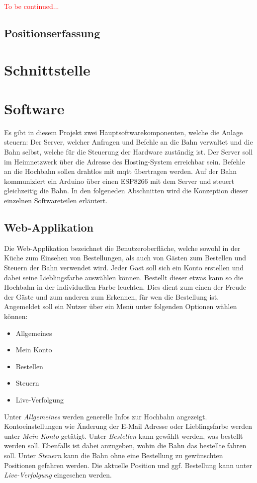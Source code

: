 \textcolor{red}{To be continued...}



\subsection{Positionserfassung}

\section{Schnittstelle}


\section{Software}
Es gibt in diesem Projekt zwei Hauptsoftwarekomponenten, welche die Anlage steuern: Der Server, welcher Anfragen und Befehle an die Bahn verwaltet und die Bahn selbst,
welche für die Steuerung der Hardware zuständig ist. Der Server soll im Heimnetzwerk über die Adresse des Hosting-System erreichbar sein. Befehle an die Hochbahn sollen drahtlos mit \acrshort{mqtt} übertragen werden.
Auf der Bahn kommuniziert ein Arduino über einen ESP8266 mit dem Server und steuert gleichzeitig die Bahn. In den folgeneden Abschnitten wird die Konzeption dieser einzelnen Softwareteilen erläutert.

\subsection{Web-Applikation}
Die Web-Applikation bezeichnet die Benutzeroberfläche, welche sowohl in der Küche zum Einsehen von Bestellungen, als auch von Gästen zum Bestellen und Steuern der Bahn verwendet wird. Jeder Gast soll sich ein Konto erstellen und dabei seine Lieblingsfarbe auswählen können.
Bestellt dieser etwas kann so die Hochbahn in der individuellen Farbe leuchten. Dies dient zum einen der Freude der Gäste und zum anderen zum Erkennen, für wen die Bestellung ist. Angemeldet soll ein Nutzer über ein Menü unter folgenden Optionen
wählen können:
\begin{itemize}
	\item Allgemeines
	\item Mein Konto
	\item Bestellen
	\item Steuern
	\item Live-Verfolgung
\end{itemize}
Unter \textit{Allgemeines} werden generelle Infos zur Hochbahn angezeigt. Kontoeinstellungen wie Änderung der E-Mail Adresse oder Lieblingsfarbe werden unter \textit{Mein Konto} getätigt. Unter \textit{Bestellen} kann gewählt werden, was bestellt werden soll.
Ebenfalls ist dabei anzugeben, wohin die Bahn das bestellte fahren soll. Unter \textit{Steuern} kann die Bahn ohne eine Bestellung zu gewünschten Positionen gefahren werden. Die aktuelle Position und ggf. Bestellung kann unter \textit{Live-Verfolgung} eingesehen werden.
